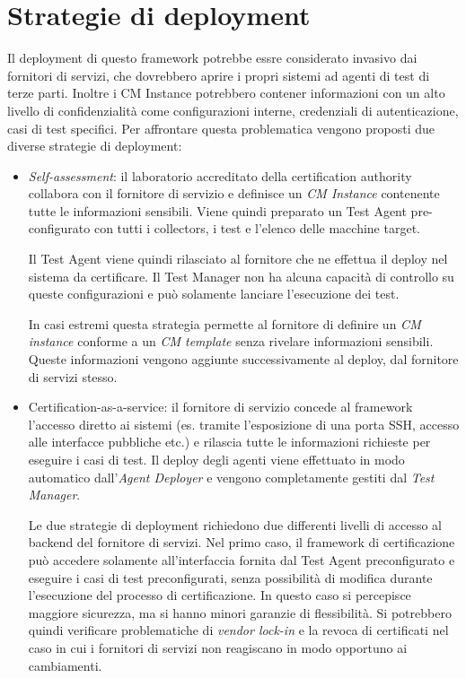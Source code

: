 \documentclass[../main.tex]{subfiles}
\begin{document}
\section{Strategie di deployment}
Il deployment di questo framework potrebbe essre considerato invasivo dai fornitori di servizi, che dovrebbero aprire i propri sistemi ad agenti di test di terze parti.
Inoltre i CM Instance potrebbero contener informazioni con un alto livello di confidenzialità come configurazioni interne, credenziali di autenticazione, casi di test specifici. Per affrontare questa problematica vengono proposti due diverse strategie di deployment:
\begin{itemize}
\item \textit{Self-assessment}: il laboratorio accreditato della certification authority collabora con il fornitore di servizio e definisce un \textit{CM Instance} contenente tutte le informazioni sensibili. Viene quindi preparato un Test Agent pre-configurato con tutti i collectors, i test e l'elenco delle macchine target.

Il Test Agent viene quindi rilasciato al fornitore che ne effettua il deploy nel sistema da certificare.
Il Test Manager non ha alcuna capacità di controllo su queste configurazioni e può solamente lanciare l'esecuzione dei test.

In casi estremi questa strategia permette al fornitore di definire un \textit{CM instance} conforme a un \textit{CM template} senza rivelare informazioni sensibili. Queste informazioni vengono aggiunte successivamente al deploy, dal fornitore di servizi stesso.
\item Certification-as-a-service: il fornitore di servizio concede al framework l'accesso diretto ai sistemi (es. tramite l'esposizione di una porta SSH, accesso alle interfacce pubbliche etc.) e rilascia tutte le informazioni richieste per eseguire i casi di test.
Il deploy degli agenti viene effettuato in modo automatico dall'\textit{Agent Deployer} e vengono completamente gestiti dal \textit{Test Manager}.

Le due strategie di deployment richiedono due differenti livelli di accesso al backend del fornitore di servizi. Nel primo caso, il framework di certificazione può accedere solamente all'interfaccia fornita dal Test Agent preconfigurato e eseguire i casi di test preconfigurati, senza possibilità di modifica durante l'esecuzione del processo di certificazione.
In questo caso si percepisce maggiore sicurezza, ma si hanno minori garanzie di flessibilità. Si potrebbero quindi verificare problematiche di \textit{vendor lock-in} e la revoca di certificati nel caso in cui i fornitori di servizi non reagiscano in modo opportuno ai cambiamenti.


\end{itemize}
\end{document}
